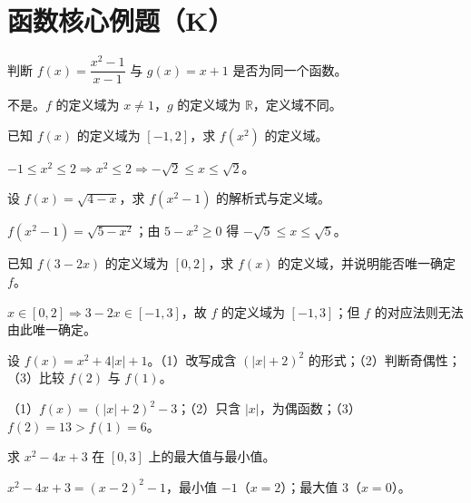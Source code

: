 \section{函数核心例题（K）}

\begin{problem}
判断 $f(x)=\dfrac{x^2-1}{x-1}$ 与 $g(x)=x+1$ 是否为同一个函数。
\end{problem}
\begin{solution}
不是。$f$ 的定义域为 $x\ne1$，$g$ 的定义域为 $\mathbb{R}$，定义域不同。
\end{solution}

\begin{problem}
已知 $f(x)$ 的定义域为 $[-1,2]$，求 $f(x^2)$ 的定义域。
\end{problem}
\begin{solution}
$-1\le x^2\le2\Rightarrow x^2\le2\Rightarrow -\sqrt2\le x\le\sqrt2$。
\end{solution}

\begin{problem}
设 $f(x)=\sqrt{4-x}$，求 $f(x^2-1)$ 的解析式与定义域。
\end{problem}
\begin{solution}
$f(x^2-1)=\sqrt{5-x^2}$；由 $5-x^2\ge0$ 得 $-\sqrt5\le x\le\sqrt5$。
\end{solution}

\begin{problem}
已知 $f(3-2x)$ 的定义域为 $[0,2]$，求 $f(x)$ 的定义域，并说明能否唯一确定 $f$。
\end{problem}
\begin{solution}
$x\in[0,2]\Rightarrow 3-2x\in[-1,3]$，故 $f$ 的定义域为 $[-1,3]$；但 $f$ 的对应法则无法由此唯一确定。
\end{solution}

\begin{problem}
设 $f(x)=x^2+4|x|+1$。（1）改写成含 $(|x|+2)^2$ 的形式；（2）判断奇偶性；（3）比较 $f(2)$ 与 $f(1)$。
\end{problem}
\begin{solution}
（1）$f(x)=(|x|+2)^2-3$；（2）只含 $|x|$，为偶函数；（3）$f(2)=13>f(1)=6$。
\end{solution}

\begin{problem}
求 $x^2-4x+3$ 在 $[0,3]$ 上的最大值与最小值。
\end{problem}
\begin{solution}
$x^2-4x+3=(x-2)^2-1$，最小值 $-1$（$x=2$）；最大值 $3$（$x=0$）。
\end{solution}

